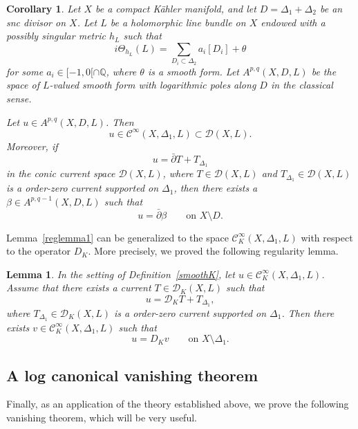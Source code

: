 \documentclass[english]{amsart}
\newcommand{\cC}{\mathcal{C}}
\newcommand{\dbar}{\bar \partial}
\newtheorem{lemme}[thm]{Lemma}
\newtheorem{cor}[thm]{Corollary}
\numberwithin{equation}{thm}
\begin{document}
			\begin{cor}\label{regcor}
				Let $X$ be a compact K\"ahler manifold, and let $D=\Delta_1+\Delta_2$ be an snc divisor on $X$.
				Let $L$ be a holomorphic line bundle on $X$ endowed with a possibly singular metric $h_L$ such that
				\[
				i\Theta_{h_L}(L)=\sum_{D_i\subset \Delta_2} a_i [D_i]+\theta
				\]
				for some $a_i\in [-1,0[\cap \mathbb Q$, where $\theta$ is a smooth form.
				Let $A^{p,q}(X,D,L)$ be the space of $L$-valued smooth form with logarithmic poles along $D$ in the classical sense. 
				
				Let $u\in A^{p,q}(X,D,L)$. Then
				\[
				u\in \cC^\infty(X,\Delta_1,L)\subset \mathcal{D}(X,L).
				\]
				Moreover, if
				\[
				u=\dbar T + T_{\Delta_1}
				\]
				in the conic current space $\mathcal{D}(X,L)$, where $T\in \mathcal{D}(X,L)$ and $T_{\Delta_1}\in \mathcal{D}(X,L)$ is a order-zero current supported on $\Delta_1$, then there exists
				a $\beta \in A^{p,q-1}(X,D,L)$ such that 
				\[
				u=\dbar \beta \qquad \text{on } X\setminus D.
				\]
			\end{cor}
			
			Lemma~\ref{reglemma1} can be generalized to the space $\cC^\infty_K(X,\Delta_1,L)$ with respect to the operator $D_K$. More precisely, we proved the following regularity lemma.
			
			\begin{lemme}\label{regularprop}\cite[Prop 10.17]{CDHP}
				In the setting of Definition~\ref{smoothK}, let $u\in \cC^\infty_K(X,\Delta_1,L)$. Assume that there exists a current $T\in \mathcal{D}_K(X,L)$ such that
				\begin{equation}\label{reg1}
					u=\mathcal{D}_K T + T_{\Delta_1},
				\end{equation}
				where $T_{\Delta_1}\in \mathcal{D}_K(X,L)$ is a order-zero current supported on $\Delta_1$.
				Then there exists $v\in \cC^\infty_K(X,\Delta_1,L)$ such that
				\begin{equation}\label{reg2}
					u = D_K v \qquad \text{on } X\setminus \Delta_1.
				\end{equation}
			\end{lemme}
			
			\bigskip
			
			\subsection{A log canonical vanishing theorem}
			
			Finally, as an application of the theory established above, we prove the following vanishing theorem, which will be very useful.
			
\end{document}
